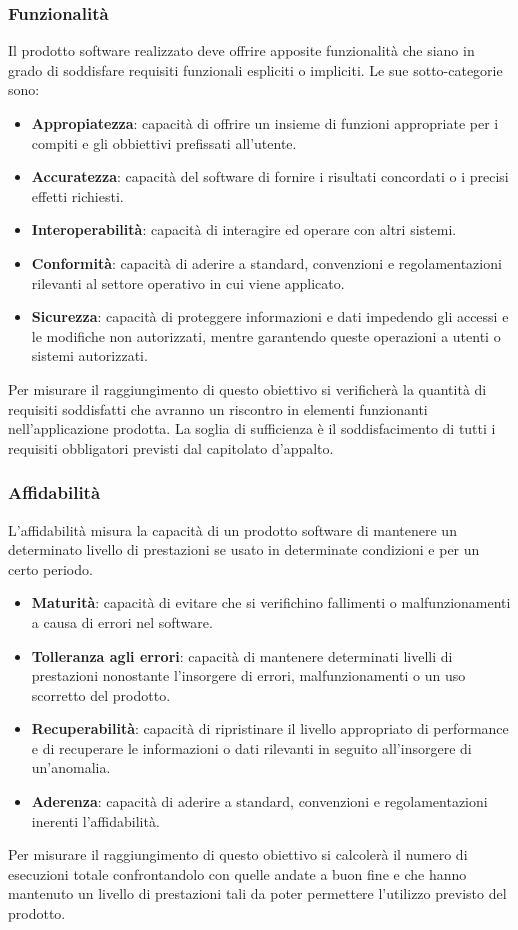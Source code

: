 \subsubsection{Funzionalità}
Il prodotto software realizzato deve offrire apposite funzionalità
che siano in grado di soddisfare requisiti funzionali espliciti o impliciti. Le sue sotto-categorie sono:
\begin{itemize}
	\item \textbf{Appropiatezza}: capacità di offrire un insieme di funzioni appropriate per i compiti e gli obbiettivi prefissati all'utente.
	\item \textbf{Accuratezza}: capacità del software di fornire i risultati concordati o i precisi effetti richiesti.
	\item \textbf{Interoperabilità}: capacità di interagire ed operare con altri sistemi.
	\item \textbf{Conformità}: capacità di aderire a standard, convenzioni e regolamentazioni rilevanti al settore operativo in cui viene applicato.
    \item \textbf{Sicurezza}: capacità di proteggere informazioni e dati impedendo gli accessi e le modifiche non autorizzati, mentre garantendo queste operazioni a utenti o sistemi autorizzati.
\end{itemize}
Per misurare il raggiungimento di questo obiettivo si verificherà
la quantità di requisiti soddisfatti che avranno un riscontro in elementi funzionanti nell'applicazione prodotta. La soglia di sufficienza è il soddisfacimento di tutti i requisiti obbligatori previsti dal capitolato d'appalto.
\subsubsection{Affidabilità}
L'affidabilità misura la capacità di un prodotto software di mantenere un determinato livello di prestazioni se usato in determinate condizioni e per un certo periodo.
\begin{itemize}
	\item \textbf{Maturità}: capacità di evitare che si verifichino fallimenti o  malfunzionamenti a causa di errori nel software.
	\item \textbf{Tolleranza agli errori}: capacità di mantenere determinati livelli di prestazioni nonostante l'insorgere di errori, malfunzionamenti o un uso scorretto del prodotto.
	\item \textbf{Recuperabilità}: capacità di ripristinare il livello appropriato di performance e di recuperare le informazioni o dati rilevanti in seguito all'insorgere di un'anomalia.
	\item \textbf{Aderenza}: capacità di aderire a standard, convenzioni e regolamentazioni inerenti l'affidabilità.
\end{itemize}
Per misurare il raggiungimento di questo obiettivo si calcolerà il numero di esecuzioni totale  confrontandolo con quelle andate a buon fine e che hanno mantenuto un livello di prestazioni tali da poter permettere l'utilizzo previsto del prodotto.
